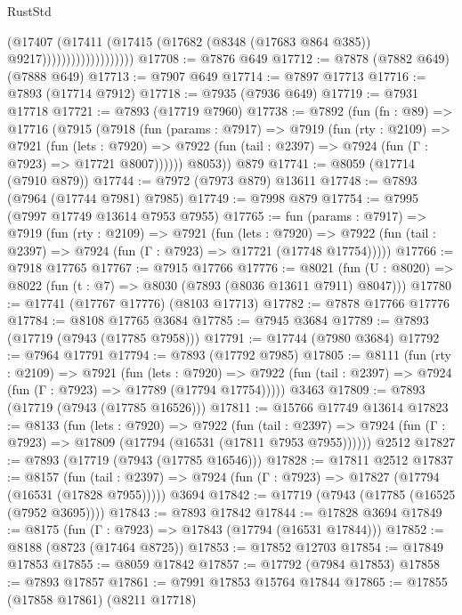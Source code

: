 \begin{lexlean}{RustStd}
\begin{coremodule}
                                  (@17407
                                    (@17411
                                      (@17415
                                        (@17682 (@8348 (@17683 @864 @385)) @9217)))))))))))))))))))
@17708 := @7876 @649
@17712 := @7878 (@7882 @649) (@7888 @649)
@17713 := @7907 @649
@17714 := @7897 @17713
@17716 := @7893 (@17714 @7912)
@17718 := @7935 (@7936 @649)
@17719 := @7931 @17718
@17721 := @7893 (@17719 @7960)
@17738 := @7892
    (fun (fn : @89) =>
    @17716
      (@7915
        (@7918
          (fun (params : @7917) =>
          @7919
            (fun (rty : @2109) =>
            @7921
              (fun (lets : @7920) =>
              @7922 (fun (tail : @2397) => @7924 (fun (Γ : @7923) => @17721 @8007))))))
        @8053))
    @879
@17741 := @8059 (@17714 (@7910 @879))
@17744 := @7972 (@7973 @879) @13611
@17748 := @7893 (@7964 (@17744 @7981) @7985)
@17749 := @7998 @879
@17754 := @7995 (@7997 @17749 @13614 @7953 @7955)
@17765 := fun (params : @7917) =>
  @7919
    (fun (rty : @2109) =>
    @7921
      (fun (lets : @7920) =>
      @7922 (fun (tail : @2397) => @7924 (fun (Γ : @7923) => @17721 (@17748 @17754)))))
@17766 := @7918 @17765
@17767 := @7915 @17766
@17776 := @8021
    (fun (U : @8020) => @8022 (fun (t : @7) => @8030 (@7893 (@8036 @13611 @7911) @8047)))
@17780 := @17741 (@17767 @17776) (@8103 @17713)
@17782 := @7878 @17766 @17776
@17784 := @8108 @17765 @3684
@17785 := @7945 @3684
@17789 := @7893 (@17719 (@7943 (@17785 @7958)))
@17791 := @17744 (@7980 @3684)
@17792 := @7964 @17791
@17794 := @7893 (@17792 @7985)
@17805 := @8111
    (fun (rty : @2109) =>
    @7921
      (fun (lets : @7920) =>
      @7922 (fun (tail : @2397) => @7924 (fun (Γ : @7923) => @17789 (@17794 @17754)))))
    @3463
@17809 := @7893 (@17719 (@7943 (@17785 @16526)))
@17811 := @15766 @17749 @13614
@17823 := @8133
    (fun (lets : @7920) =>
    @7922
      (fun (tail : @2397) =>
      @7924 (fun (Γ : @7923) => @17809 (@17794 (@16531 (@17811 @7953 @7955))))))
    @2512
@17827 := @7893 (@17719 (@7943 (@17785 @16546)))
@17828 := @17811 @2512
@17837 := @8157
    (fun (tail : @2397) => @7924 (fun (Γ : @7923) => @17827 (@17794 (@16531 (@17828 @7955)))))
    @3694
@17842 := @17719 (@7943 (@17785 (@16525 (@7952 @3695))))
@17843 := @7893 @17842
@17844 := @17828 @3694
@17849 := @8175 (fun (Γ : @7923) => @17843 (@17794 (@16531 @17844)))
@17852 := @8188 (@8723 (@17464 @8725))
@17853 := @17852 @12703
@17854 := @17849 @17853
@17855 := @8059 @17842
@17857 := @17792 (@7984 @17853)
@17858 := @7893 @17857
@17861 := @7991 @17853 @15764 @17844
@17865 := @17855 (@17858 @17861) (@8211 @17718)

\end{coremodule}
\end{lexlean}
